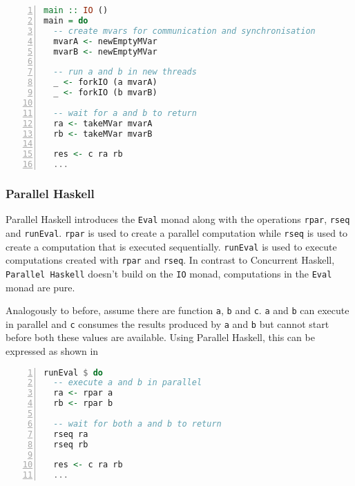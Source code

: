 \begin{lstlisting}[language=Haskell, numbers=left, frame=bt, label=lst:example_concurrent_haskell, caption={Parallel and sequential composition in \textsf{Concurrent Haskell}.}]
main :: IO ()
main = do
  -- create mvars for communication and synchronisation
  mvarA <- newEmptyMVar
  mvarB <- newEmptyMVar  
  
  -- run a and b in new threads
  _ <- forkIO (a mvarA)
  _ <- forkIO (b mvarB)  
  
  -- wait for a and b to return
  ra <- takeMVar mvarA
  rb <- takeMVar mvarB
  
  res <- c ra rb
  ...
\end{lstlisting}

\subsubsection{Parallel Haskell}
\textsf{Parallel Haskell} introduces the \texttt{Eval} monad along with the operations \texttt{rpar}, \texttt{rseq} and \texttt{runEval}. \texttt{rpar} is used to create a parallel computation while \texttt{rseq} is used to create a computation that is executed sequentially. \texttt{runEval} is used to execute computations created with \texttt{rpar} and \texttt{rseq}. In contrast to \textsf{Concurrent Haskell}, \texttt{Parallel Haskell} doesn't build on the \texttt{IO} monad, computations in the \texttt{Eval} monad are pure.

Analogously to before, assume there are function \texttt{a}, \texttt{b} and \texttt{c}. \texttt{a} and \texttt{b} can execute in parallel and \texttt{c} consumes the results produced by \texttt{a} and \texttt{b} but cannot start before both these values are available. Using \textsf{Parallel Haskell}, this can be expressed as shown in 
\begin{lstlisting}[language=Haskell, numbers=left, frame=bt, label=lst:example_parallel_haskell, caption={Parallel and sequential composition in \textsf{Parallel Haskell}.}]
runEval $ do
  -- execute a and b in parallel
  ra <- rpar a
  rb <- rpar b
  
  -- wait for both a and b to return
  rseq ra
  rseq rb
  
  res <- c ra rb
  ...
\end{lstlisting}